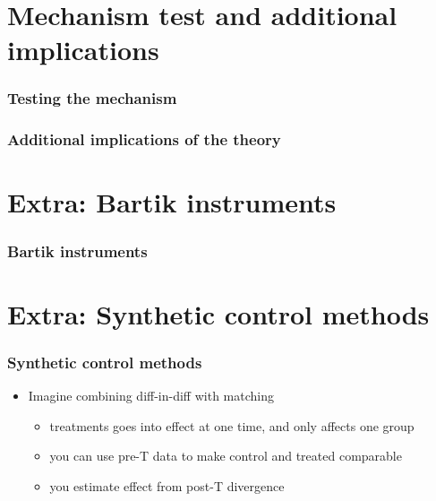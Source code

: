 \documentclass[aspectratio=43]{beamer}
\begin{document}
\section{Mechanism test and additional implications}

\begin{frame}
\frametitle{Testing the mechanism}
\centering



\end{frame}

\begin{frame}
\frametitle{Additional implications of the theory}
\centering



\end{frame}

\section{Extra: Bartik instruments}

\begin{frame}
\frametitle{Bartik instruments}
\centering



\end{frame}

\section{Extra: Synthetic control methods}

\begin{frame}
\frametitle{Synthetic control methods}
\centering

\begin{itemize}
  \item Imagine combining diff-in-diff with matching
  \begin{itemize}
    \item treatments goes into effect at one time, and only affects one group
    \item you can use pre-T data to make control and treated comparable
    \item you estimate effect from post-T divergence
  \end{itemize}
\end{itemize}

\end{frame}
\end{document}
